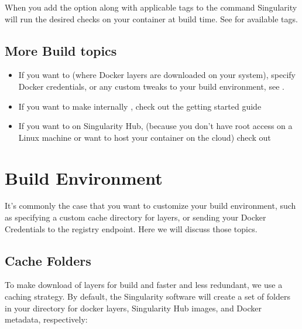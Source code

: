 \documentclass[letterpaper,10pt,english]{sphinxmanual}
\begin{document}
When you add the  option along with applicable tags to the  command
Singularity will run the desired checks on your container at build time.
See  for available tags.


\section{More Build topics}
\label{\detokenize{build_a_container:more-build-topics}}\begin{itemize}
\item {} 
If you want to  (where Docker layers
are downloaded on your system), specify Docker credentials, or any
custom tweaks to your build environment, see {\hyperref[\detokenize{build_environment:build-environment}]{}}.

\item {} 
If you want to make internally , check out the
getting started guide 

\item {} 
If you want to  on Singularity Hub, (because
you don’t have root access on a Linux machine or want to host your
container on the cloud) check out 

\end{itemize}


\chapter{Build Environment}
\label{\detokenize{build_environment:build-environment}}\label{\detokenize{build_environment:id1}}\label{\detokenize{build_environment::doc}}\label{\detokenize{build_environment:sec-buildenv}}
It’s commonly the case that you want to customize your build
environment, such as specifying a custom cache directory for layers, or
sending your Docker Credentials to the registry endpoint. Here we will discuss those topics.


\section{Cache Folders}
\label{\detokenize{build_environment:cache-folders}}
To make download of layers for build and {\hyperref[\detokenize{appendix:pull-command}]{}} faster and less redundant, we
use a caching strategy. By default, the Singularity software will create
a set of folders in your  directory for docker layers, Singularity Hub
images, and Docker metadata, respectively:
\end{document}
